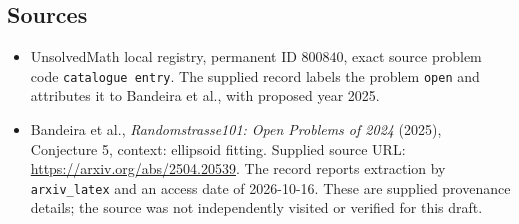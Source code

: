\documentclass[11pt]{article}
\begin{document}
\subsection{Sources}
\begin{itemize}
\item UnsolvedMath local registry, permanent ID \(800840\), exact source problem code \texttt{catalogue entry}. The supplied record labels the problem \texttt{open} and attributes it to Bandeira et al., with proposed year 2025.
\item Bandeira et al., \emph{Randomstrasse101: Open Problems of 2024} (2025), Conjecture 5, context: ellipsoid fitting. Supplied source URL: \url{https://arxiv.org/abs/2504.20539}. The record reports extraction by \texttt{arxiv\_latex} and an access date of 2026-10-16. These are supplied provenance details; the source was not independently visited or verified for this draft.
\end{itemize}
\end{document}
